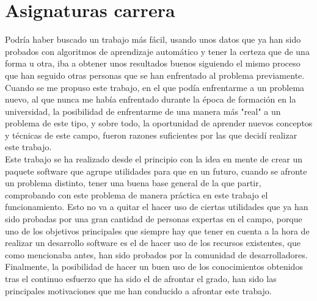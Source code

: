 \section{Asignaturas carrera}
Podría haber buscado un trabajo más fácil, usando unos datos que ya han sido probados con algoritmos de aprendizaje automático y tener la certeza que de una forma u otra, iba a obtener unos resultados buenos siguiendo el mismo proceso que han seguido otras personas que se han enfrentado al problema previamente. Cuando se me propuso este trabajo, en el que podía enfrentarme a un problema nuevo, al que nunca me había enfrentado durante la época de formación en la universidad, la posibilidad de enfrentarme de una manera más "real" a un problema de este tipo, y sobre todo, la oportunidad de aprender nuevos conceptos y técnicas de este campo, fueron razones suficientes por las que decidí realizar este trabajo.\\
\linebreak
Este trabajo se ha realizado desde el principio con la idea en mente de crear un paquete software que agrupe utilidades para que en un futuro, cuando se afronte un problema distinto, tener una buena base general de la que partir, comprobando con  este problema de manera práctica en este trabajo el funcionamiento. Esto no va a quitar el hacer uso de ciertas utilidades que ya han sido probadas por una gran cantidad de personas expertas en el campo, porque uno de los objetivos principales que siempre hay que tener en cuenta a la hora de realizar un desarrollo software es el de hacer uso de los recursos existentes, que como mencionaba antes, han sido probados por la comunidad de desarrolladores.\\ 
\linebreak
Finalmente, la posibilidad de hacer un buen uso de los conocimientos obtenidos tras el continuo esfuerzo que ha sido el de afrontar el grado, han sido las principales motivaciones que me han conducido a afrontar este trabajo.
\clearpage
